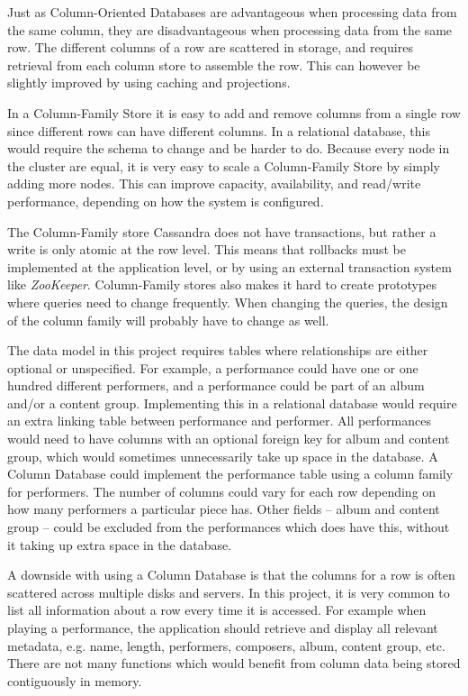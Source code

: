 Just as Column-Oriented Databases are advantageous when processing data from the same column, they are disadvantageous when processing data from the same row. The different columns of a row are scattered in storage, and requires retrieval from each column store to assemble the row. This can however be slightly improved by using caching and projections.

In a Column-Family Store it is easy to add and remove columns from a single row since different rows can have different columns. In a relational database, this would require the schema to change and be harder to do.
Because every node in the cluster are equal, it is very easy to scale a Column-Family Store by simply adding more nodes. This can improve capacity, availability, and read/write performance, depending on how the system is configured.

The Column-Family store Cassandra does not have transactions, but rather a write is only atomic at the row level. This means that rollbacks must be implemented at the application level, or by using an external transaction system like \emph{ZooKeeper}.
Column-Family stores also makes it hard to create prototypes where queries need to change frequently. When changing the queries, the design of the column family will probably have to change as well.

The data model in this project requires tables where relationships are either optional or unspecified. For example, a performance could have one or one hundred different performers, and a performance could be part of an album and/or a content group. Implementing this in a relational database would require an extra linking table between performance and performer. All performances would need to have columns with an optional foreign key for album and content group, which would sometimes unnecessarily take up space in the database. A Column Database could implement the performance table using a column family for performers. The number of columns could vary for each row depending on how many performers a particular piece has. Other fields -- album and content group -- could be excluded from the performances which does have this, without it taking up extra space in the database.

A downside with using a Column Database is that the columns for a row is often scattered across multiple disks and servers. In this project, it is very common to list all information about a row every time it is accessed. For example when playing a performance, the application should retrieve and display all relevant metadata, e.g. name, length, performers, composers, album, content group, etc. There are not many functions which would benefit from column data being stored contiguously in memory.

